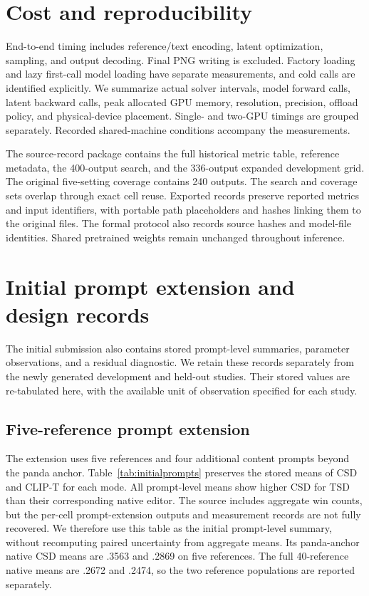 \section{Cost and reproducibility}
End-to-end timing includes reference/text encoding, latent optimization,
sampling, and output decoding. Final PNG writing is excluded. Factory
loading and lazy first-call model loading have separate measurements, and
cold calls are identified explicitly. We summarize actual solver intervals,
model forward calls, latent backward calls, peak allocated GPU memory,
resolution, precision, offload policy, and physical-device placement.
Single- and two-GPU timings are grouped separately. Recorded shared-machine
conditions accompany the measurements.

The source-record package contains the full historical metric table,
reference metadata, the 400-output search, and the 336-output expanded
development grid. The original five-setting coverage contains 240 outputs. The search and coverage sets overlap through exact cell reuse.
Exported records preserve reported metrics and input identifiers, with
portable path placeholders and hashes linking them to the original files.
The formal protocol also records source hashes and model-file identities.
Shared pretrained weights remain unchanged throughout inference.

\section{Initial prompt extension and design records}
\label{sec:initialextension}
The initial submission also contains stored prompt-level summaries,
parameter observations, and a residual diagnostic. We retain these records
separately from the newly generated development and held-out studies.
Their stored values are re-tabulated here, with the available unit of
observation specified for each study.

\subsection{Five-reference prompt extension}
The extension uses five references and four additional content prompts
beyond the panda anchor. Table~\ref{tab:initialprompts} preserves the stored
means of CSD and CLIP-T for each mode. All prompt-level means show higher
CSD for TSD than their corresponding native editor. The source includes
aggregate win counts, but the per-cell prompt-extension outputs and
measurement records are not fully recovered. We therefore use this table
as the initial prompt-level summary, without recomputing paired uncertainty
from aggregate means. Its panda-anchor native CSD means are .3563 and
.2869 on five references. The full 40-reference native means are .2672 and
.2474, so the two reference populations are reported separately.

